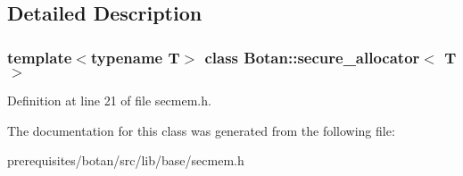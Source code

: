 \subsection{Detailed Description}
\subsubsection*{template$<$typename T$>$\newline
class Botan\+::secure\+\_\+allocator$<$ T $>$}



Definition at line 21 of file secmem.\+h.



The documentation for this class was generated from the following file\+:\begin{DoxyCompactItemize}
\item 
prerequisites/botan/src/lib/base/secmem.\+h\end{DoxyCompactItemize}
